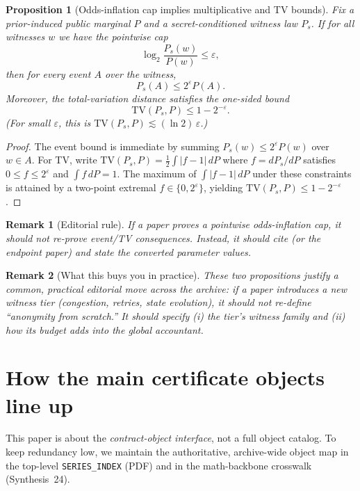 \documentclass[11pt]{article}
\newtheorem{proposition}{Proposition}
\newtheorem{remark}{Remark}
\newcommand{\TV}{\mathrm{TV}}
\newcommand{\eps}{\varepsilon}
\newcommand{\logtwo}{\log_2}
\begin{document}
\begin{proposition}[Odds-inflation cap implies multiplicative and TV bounds]\label{prop:oi_to_tv}
Fix a prior-induced public marginal $P$ and a secret-conditioned witness law $P_s$.
If for all witnesses $w$ we have the pointwise cap
\[
\logtwo\frac{P_s(w)}{P(w)} \le \eps,
\]
then for every event $A$ over the witness,
\[
P_s(A)\le 2^{\eps} P(A).
\]
Moreover, the total-variation distance satisfies the one-sided bound
\[
\TV(P_s,P)\le 1-2^{-\eps}.
\]
(For small $\eps$, this is $\TV(P_s,P)\lesssim (\ln 2)\,\eps$.)
\end{proposition}

\begin{proof}
The event bound is immediate by summing $P_s(w)\le 2^{\eps}P(w)$ over $w\in A$.
For TV, write $\TV(P_s,P)=\tfrac12\int |f-1|\,dP$ where $f=dP_s/dP$ satisfies $0\le f\le 2^{\eps}$ and $\int f\,dP=1$.
The maximum of $\int |f-1|\,dP$ under these constraints is attained by a two-point extremal $f\in\{0,2^{\eps}\}$, yielding $\TV(P_s,P)\le 1-2^{-\eps}$.
\end{proof}

\begin{remark}[Editorial rule]
If a paper proves a pointwise odds-inflation cap, it should \emph{not} re-prove event/TV consequences.
Instead, it should cite  (or the endpoint paper) and state the converted parameter values.
\end{remark}

\begin{remark}[What this buys you in practice]

These two propositions justify a common, practical editorial move across the archive:
if a paper introduces a \emph{new witness tier} (congestion, retries, state evolution),
it should not re-define ``anonymity from scratch.'' It should specify (i) the tier's witness family and (ii) how its budget
adds into the global accountant.
\end{remark}

\section{How the main certificate objects line up}

This paper is about the \emph{contract-object interface}, not a full object catalog.
To keep redundancy low, we maintain the authoritative, archive-wide object map in the top-level \texttt{SERIES\_INDEX} (PDF) and in the math-backbone crosswalk (Synthesis~24).\cite{series:mathcrosswalk}
\end{document}

